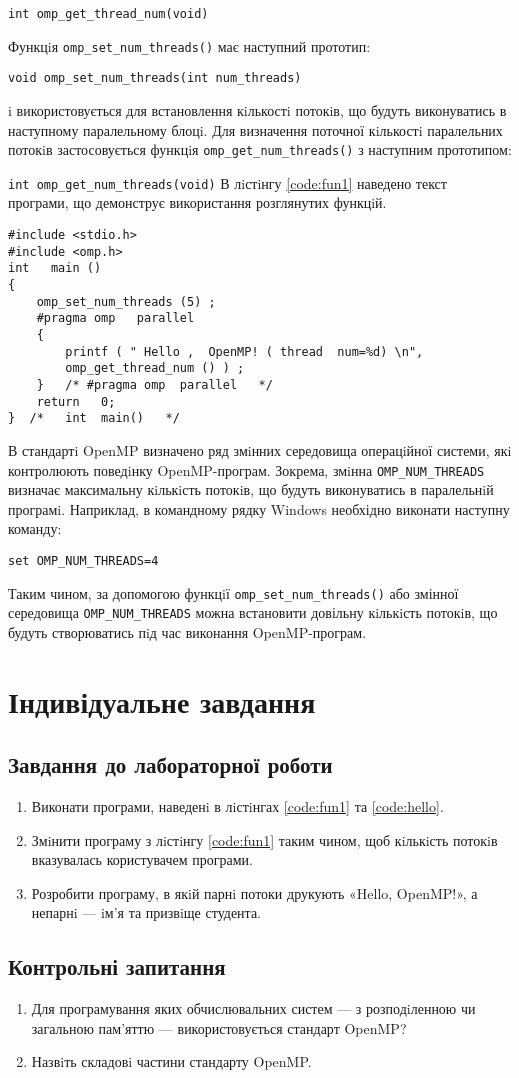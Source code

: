 \verb'int omp_get_thread_num(void)'

Функцiя \verb'omp_set_num_threads()' має наступний прототип:

\verb'void omp_set_num_threads(int num_threads)'

i використовується для встановлення кiлькостi потокiв, що будуть виконуватись в наступному паралельному блоцi. Для визначення поточної кiлькостi паралельних потокiв застосовується функцiя \verb'omp_get_num_threads()' з наступним прототипом:

\verb'int omp_get_num_threads(void)'
В лiстiнгу \ref{code:fun1} наведено текст програми, що демонструє використання розглянутих функцiй.
\begin{lstlisting}[label=code:fun1,caption=Функцiї OpenMP]
#include <stdio.h> 
#include <omp.h>
int   main ()
{
	omp_set_num_threads (5) ;
	#pragma omp   parallel
	{
		printf ( " Hello ,  OpenMP! ( thread  num=%d) \n", 
		omp_get_thread_num () ) ; 
	}   /* #pragma omp  parallel   */
	return   0;
}  /*   int  main()   */
\end{lstlisting}

В стандартi OpenMP визначено ряд змiнних середовища операцiйної системи, якi контролюють поведiнку OpenMP-програм. Зокрема, змiнна \verb'OMP_NUM_THREADS' визначає максимальну кiлькiсть потокiв, що будуть виконуватись в паралельнiй програмi. Наприклад, в командному рядку Windows необхідно виконати наступну команду:

\verb'set OMP_NUM_THREADS=4'

Таким чином, за допомогою функцiї \verb'omp_set_num_threads()' або змінної середовища \verb'OMP_NUM_THREADS' можна встановити довільну кiлькiсть потокiв, що будуть створюватись пiд час виконання OpenMP-програм.

\section{Індивідуальне завдання}
\nopagebreak[4]
\subsection*{Завдання до лабораторної роботи}
\nopagebreak[4]
\begin{enumerate}
\item Виконати програми, наведенi в лiстiнгах \ref{code:fun1} та \ref{code:hello}.
\item Змiнити програму з лiстiнгу \ref{code:fun1} таким чином, щоб кiлькiсть потокiв вказувалась користувачем програми.
\item Розробити програму, в якiй парнi потоки друкують «Hello, OpenMP!», а непарнi — iм’я та призвiще студента.

\end{enumerate}

\subsection*{Контрольні запитання}
\nopagebreak[4]
\begin{enumerate}
\item Для програмування яких обчислювальних систем — з розподiленною чи загальною пам’яттю — використовується стандарт OpenMP?
\item Назвiть складовi частини стандарту OpenMP.

\end{enumerate}



